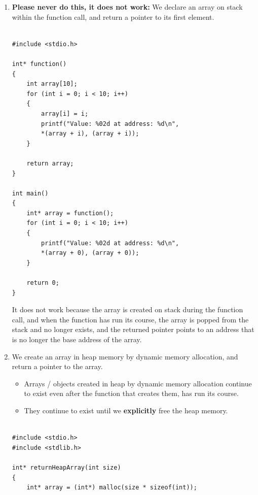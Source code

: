 \documentclass[12pt]{article}
\begin{document}
\begin{enumerate}
    \item \textbf{Please never do this, it does not work:} We declare an array on stack within the function call, and return a pointer to its first element.

\begin{verbatim}

#include <stdio.h>

int* function()
{
    int array[10];
    for (int i = 0; i < 10; i++)
    {
        array[i] = i;
        printf("Value: %02d at address: %d\n", 
        *(array + i), (array + i));
    }

    return array;
}

int main()
{
    int* array = function();
    for (int i = 0; i < 10; i++)
    {
        printf("Value: %02d at address: %d\n", 
        *(array + 0), (array + 0));
    }

    return 0;
}

\end{verbatim}

\vspace{1cm} 

\noindent It does not work because the array is created on stack during the function call, and when the function has run its course, the array is popped from the stack and no longer exists, 
and the returned pointer points to an address that is no longer the base address of the array. \\ 

    \newpage

    \item We create an array in heap memory by dynamic memory allocation, and return a pointer to the array. 
    
    \begin{itemize}
        \item Arrays / objects created in heap by dynamic memory allocation continue to exist even after the function that creates them, has run its course.
        \item They continue to exist until we \textbf{explicitly} free the heap memory.
    \end{itemize}

\begin{verbatim}

#include <stdio.h>
#include <stdlib.h>

int* returnHeapArray(int size)
{
    int* array = (int*) malloc(size * sizeof(int));


\end{verbatim}
\end{enumerate}
\end{document}
